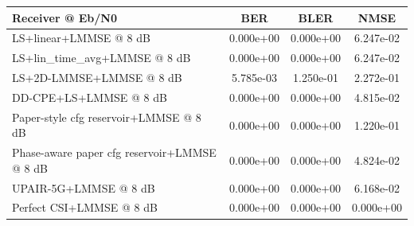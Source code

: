 \begin{tabular}{lccc}
\toprule
Receiver @ Eb/N0 & BER & BLER & NMSE \\
\midrule
LS+linear+LMMSE @ 8 dB & 0.000e+00 & 0.000e+00 & 6.247e-02 \\
LS+lin_time_avg+LMMSE @ 8 dB & 0.000e+00 & 0.000e+00 & 6.247e-02 \\
LS+2D-LMMSE+LMMSE @ 8 dB & 5.785e-03 & 1.250e-01 & 2.272e-01 \\
DD-CPE+LS+LMMSE @ 8 dB & 0.000e+00 & 0.000e+00 & 4.815e-02 \\
Paper-style cfg reservoir+LMMSE @ 8 dB & 0.000e+00 & 0.000e+00 & 1.220e-01 \\
Phase-aware paper cfg reservoir+LMMSE @ 8 dB & 0.000e+00 & 0.000e+00 & 4.824e-02 \\
UPAIR-5G+LMMSE @ 8 dB & 0.000e+00 & 0.000e+00 & 6.168e-02 \\
Perfect CSI+LMMSE @ 8 dB & 0.000e+00 & 0.000e+00 & 0.000e+00 \\
\bottomrule
\end{tabular}